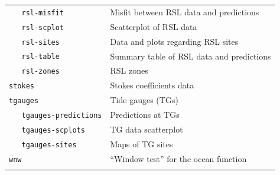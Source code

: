 \documentclass[11pt,fleqn,a4paper,titlepage]{article}
\begin{document}
\begin{table}[!hbp]
\begin{center}
\begin{tabular}{ll}
\texttt{~~~rsl-misfit}  & Misfit between RSL data and predictions \\[0.0em]
\texttt{~~~rsl-scplot} & Scatterplot of RSL data \\[0.0em]
\texttt{~~~rsl-sites} & Data and plots regarding RSL sites \\[0.0em]
\texttt{~~~rsl-table} & Summary table of RSL data and predictions \\[0.0em]
\texttt{~~~rsl-zones} & RSL zones \\[0.0em]
\texttt{stokes}   &  Stokes coefficients data \\[0.0em]
\texttt{tgauges}   & Tide gauges (TGs) \\[0.0em]
\texttt{~~~tgauges-predictions}  & Predictions at TGs   \\[0.0em]
\texttt{~~~tgauges-scplots}  & TG data scatterplot \\[0.0em]
\texttt{~~~tgauges-sites} & Maps of TG sites\\[0.0em]
\texttt{wnw}   & ``Window test'' for the ocean function \\
\hline
\label{table:folders}
\end{tabular}
\end{center}
\end{table}
\clearpage
\end{document}
